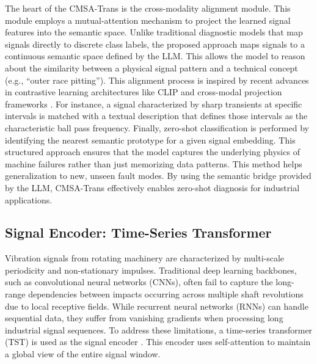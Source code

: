 \documentclass[journal]{IEEEtran}
\begin{document}
The heart of the CMSA-Trans is the cross-modality alignment module. This module employs a mutual-attention mechanism to project the learned signal features into the semantic space. Unlike traditional diagnostic models that map signals directly to discrete class labels, the proposed approach maps signals to a continuous semantic space defined by the LLM. This allows the model to reason about the similarity between a physical signal pattern and a technical concept (e.g., ``outer race pitting''). This alignment process is inspired by recent advances in contrastive learning architectures like CLIP \cite{radford2021learning} and cross-modal projection frameworks \cite{oord2018representation, chen2020simple}. For instance, a signal characterized by sharp transients at specific intervals is matched with a textual description that defines those intervals as the characteristic ball pass frequency. Finally, zero-shot classification is performed by identifying the nearest semantic prototype for a given signal embedding. This structured approach ensures that the model captures the underlying physics of machine failures rather than just memorizing data patterns. This method helps generalization to new, unseen fault modes. By using the semantic bridge provided by the LLM, CMSA-Trans effectively enables zero-shot diagnosis for industrial applications.

\subsection{Signal Encoder: Time-Series Transformer}

Vibration signals from rotating machinery are characterized by multi-scale periodicity and non-stationary impulses. Traditional deep learning backbones, such as convolutional neural networks (CNNs), often fail to capture the long-range dependencies between impacts occurring across multiple shaft revolutions due to local receptive fields. While recurrent neural networks (RNNs) can handle sequential data, they suffer from vanishing gradients when processing long industrial signal sequences. To address these limitations, a time-series transformer (TST) is used as the signal encoder \cite{zerveas2021transformer}. This encoder uses self-attention to maintain a global view of the entire signal window.
\end{document}

